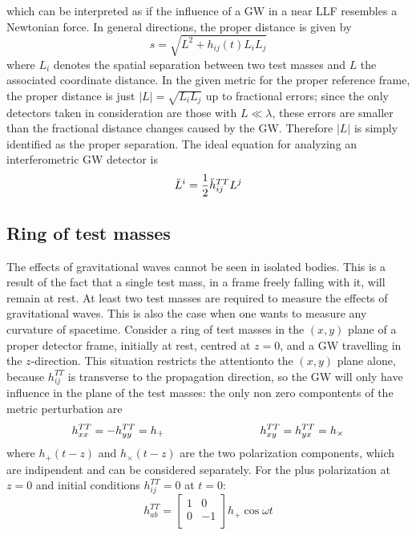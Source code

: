 \documentclass[binding=0.6cm, LaM]{sapthesis}
\begin{document}
which can be interpreted as if the influence of a GW in a near LLF resembles a Newtonian force.
In general directions, the proper distance is given by
\begin{equation}
s = \sqrt{L^2 + h_{ij}(t)L_{i}L_{j}}
\end{equation}
where $L_i$ denotes the spatial separation between two test masses and $L$ the associated coordinate distance.
In the given metric for the proper reference frame, the proper distance is just $|L| = \sqrt{L_iL_j}$ up to fractional errors; since the only detectors taken in consideration are those 
with $L \ll \lambda$, these errors are smaller than the fractional distance changes caused by the GW. 
Therefore $|L|$ is simply identified as the proper separation. The ideal equation for analyzing an interferometric GW detector is
\begin{equation}
{\ddot L}^i = {1 \over 2}{\ddot h}_{ij}^{TT}L^j
\end{equation}



 
\subsection{Ring of test masses}

The effects of gravitational waves cannot be seen in isolated bodies. This is a result of
the fact that a single test mass, in a frame freely falling with it, will remain at rest. At
least two test masses are required to measure the effects of gravitational waves. This is also
the case when one wants to measure any curvature of spacetime. 
Consider a ring of test masses in the $(x, y)$ plane of a proper detector frame, initially at rest, centred at $z = 0$, and a GW travelling in the $z$-direction. 
This situation restricts the attentionto the $(x,y)$ plane alone, because $h_{ij}^{TT}$ is transverse to the propagation direction, so the GW will only have influence in the plane of the test masses:
 the only non zero compontents of the metric perturbation are
\begin{equation}
h_{xx}^{TT} = - h_{yy}^{TT} = h_{+} \hspace*{3cm} h_{xy}^{TT} = h_{yx}^{TT} = h_{\times}
\end{equation}
where $h_{+}(t-z)$ and $h_{\times}(t-z)$ are the two polarization components, which are indipendent and can be considered separately.
For the plus polarization at $z=0$ and initial conditions $h_{ij}^{TT} = 0$ at $t=0$:
\begin{equation}
h_{ab}^{TT} = 
\begin{bmatrix}
1  & 0 \\
0 &  -1 \\
\end{bmatrix} 
h_{+}\cos \omega t
\end{equation}
\end{document}

